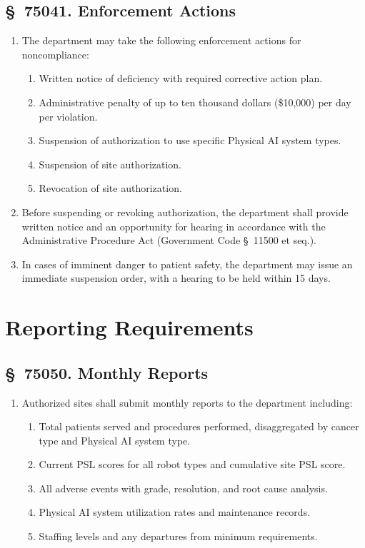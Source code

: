 \subsection{\S~75041. Enforcement Actions}

\begin{enumerate}[label=(\alph*)]
\item The department may take the following enforcement actions for
  noncompliance:
  \begin{enumerate}[label=(\arabic*)]
  \item Written notice of deficiency with required corrective action plan.
  \item Administrative penalty of up to ten thousand dollars (\$10,000) per
    day per violation.
  \item Suspension of authorization to use specific Physical AI system types.
  \item Suspension of site authorization.
  \item Revocation of site authorization.
  \end{enumerate}

\item Before suspending or revoking authorization, the department shall provide
  written notice and an opportunity for hearing in accordance with the
  Administrative Procedure Act (Government Code \S~11500 et seq.).

\item In cases of imminent danger to patient safety, the department may issue
  an immediate suspension order, with a hearing to be held within 15 days.
\end{enumerate}

\section{Reporting Requirements}

\subsection{\S~75050. Monthly Reports}

\begin{enumerate}[label=(\alph*)]
\item Authorized sites shall submit monthly reports to the department including:
  \begin{enumerate}[label=(\arabic*)]
  \item Total patients served and procedures performed, disaggregated by
    cancer type and Physical AI system type.
  \item Current PSL scores for all robot types and cumulative site PSL score.
  \item All adverse events with grade, resolution, and root cause analysis.
  \item Physical AI system utilization rates and maintenance records.
  \item Staffing levels and any departures from minimum requirements.
  \end{enumerate}
\end{enumerate}


